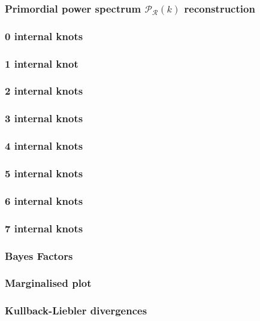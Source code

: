 \documentclass[aspectratio=169]{beamer}
\begin{document}
\newcommand{\movablevert}[1]{%
  \draw[->](#1) -- ++(90:\croslen);
  \draw[->](#1) -- ++(270:\croslen);
  \fill[red!70!black] (#1) circle (2pt);
}


\begin{frame}
    \frametitle<1-5>{Primordial power spectrum $\mathcal{P}_\mathcal{R}(k)$ reconstruction~}
  \frametitle<6|handout:0>{0 internal knots}
  \frametitle<7|handout:0>{1 internal knot}
  \frametitle<8|handout:0>{2 internal knots}
  \frametitle<9|handout:0>{3 internal knots}
  \frametitle<10|handout:0>{4 internal knots}
  \frametitle<11|handout:0>{5 internal knots}
  \frametitle<12|handout:0>{6 internal knots}
  \frametitle<13|handout:0>{7 internal knots}
  \frametitle<14|handout:0>{Bayes Factors}
  \frametitle<15|handout:0>{Marginalised plot}
  \frametitle<16|handout:0>{Kullback-Liebler divergences}


  \begin{columns}

\end{columns}
\end{frame}
\end{document}

